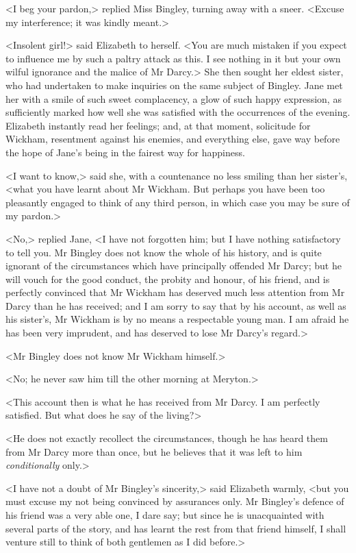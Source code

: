 <I beg your pardon,> replied Miss Bingley, turning away with a sneer. <Excuse my interference; it was kindly meant.>

<Insolent girl!> said Elizabeth to herself. <You are much mistaken if you expect to influence me by such a paltry attack as this. I see nothing in it but your own wilful ignorance and the malice of Mr Darcy.> She then sought her eldest sister, who had undertaken to make inquiries on the same subject of Bingley. Jane met her with a smile of such sweet complacency, a glow of such happy expression, as sufficiently marked how well she was satisfied with the occurrences of the evening. Elizabeth instantly read her feelings; and, at that moment, solicitude for Wickham, resentment against his enemies, and everything else, gave way before the hope of Jane's being in the fairest way for happiness.

<I want to know,> said she, with a countenance no less smiling than her sister's, <what you have learnt about Mr Wickham. But perhaps you have been too pleasantly engaged to think of any third person, in which case you may be sure of my pardon.>

<No,> replied Jane, <I have not forgotten him; but I have nothing satisfactory to tell you. Mr Bingley does not know the whole of his history, and is quite ignorant of the circumstances which have principally offended Mr Darcy; but he will vouch for the good conduct, the probity and honour, of his friend, and is perfectly convinced that Mr Wickham has deserved much less attention from Mr Darcy than he has received; and I am sorry to say that by his account, as well as his sister's, Mr Wickham is by no means a respectable young man. I am afraid he has been very imprudent, and has deserved to lose Mr Darcy's regard.>

<Mr Bingley does not know Mr Wickham himself.>

<No; he never saw him till the other morning at Meryton.>

<This account then is what he has received from Mr Darcy. I am perfectly satisfied. But what does he say of the living?>

<He does not exactly recollect the circumstances, though he has heard them from Mr Darcy more than once, but he believes that it was left to him \textit{conditionally} only.>

<I have not a doubt of Mr Bingley's sincerity,> said Elizabeth warmly, <but you must excuse my not being convinced by assurances only. Mr Bingley's defence of his friend was a very able one, I dare say; but since he is unacquainted with several parts of the story, and has learnt the rest from that friend himself, I shall venture still to think of both gentlemen as I did before.>

